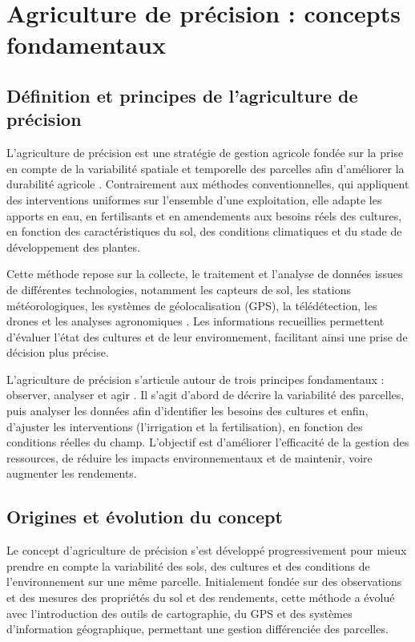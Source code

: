 \section{Agriculture de précision :  concepts fondamentaux}

\subsection{Définition et principes de l'agriculture de précision}
L'agriculture de précision est une stratégie de gestion agricole fondée sur la prise en compte de la variabilité spatiale et temporelle des parcelles afin d'améliorer la durabilité agricole \cite{monteiro_precision_2021}. Contrairement aux méthodes conventionnelles, qui appliquent des interventions uniformes sur l'ensemble d'une exploitation, elle adapte les apports en eau, en fertilisants et en amendements aux besoins réels des cultures, en fonction des caractéristiques du sol, des conditions climatiques et du stade de développement des plantes.

Cette méthode repose sur la collecte, le traitement et l'analyse de données issues de différentes technologies, notamment les capteurs de sol, les stations météorologiques, les systèmes de géolocalisation (GPS), la télédétection, les drones et les analyses agronomiques \cite{shaheb_precision_2022}. Les informations recueillies permettent d'évaluer l'état des cultures et de leur environnement, facilitant ainsi une prise de décision plus précise.

L'agriculture de précision s'articule autour de trois principes fondamentaux : observer, analyser et agir \cite{noauthor_precision_2026}. Il s'agit d'abord de décrire la variabilité des parcelles, puis analyser les données afin d'identifier les besoins des cultures et enfin, d'ajuster les interventions (l'irrigation et la fertilisation), en fonction des conditions réelles du champ. 
L'objectif est d’améliorer l'efficacité de la gestion des ressources, de réduire les impacts environnementaux et de maintenir, voire augmenter les rendements.

\subsection{Origines et évolution du concept}
Le concept d’agriculture de précision s’est développé progressivement pour mieux prendre en compte la variabilité des sols, des cultures et des conditions de  l'environnement sur une même parcelle. 
Initialement fondée sur des observations et des mesures des propriétés du sol et des rendements, cette méthode a évolué avec l’introduction des outils de cartographie, du GPS et des systèmes d’information géographique, permettant une gestion différenciée des parcelles.

